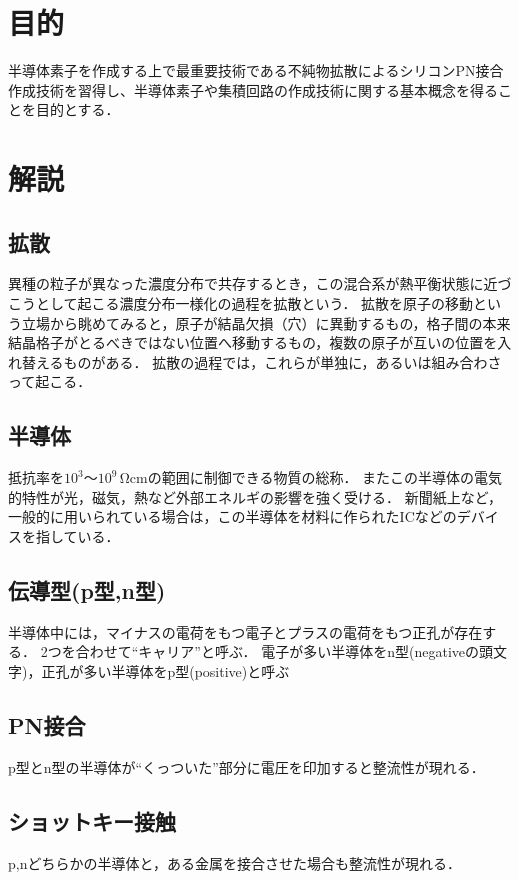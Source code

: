 \documentclass[11pt]{jarticle}
\title{}
\begin{document}
\maketitle

\section{目的}
半導体素子を作成する上で最重要技術である不純物拡散によるシリコンPN接合作成技術を習得し、半導体素子や集積回路の作成技術に関する基本概念を得ることを目的とする．
\section{解説}
	\subsection{拡散}
		異種の粒子が異なった濃度分布で共存するとき，この混合系が熱平衡状態に近づこうとして起こる濃度分布一様化の過程を拡散という．
		拡散を原子の移動という立場から眺めてみると，原子が結晶欠損（穴）に異動するもの，格子間の本来結晶格子がとるべきではない位置へ移動するもの，複数の原子が互いの位置を入れ替えるものがある．
		拡散の過程では，これらが単独に，あるいは組み合わさって起こる．
	\subsection{半導体}
		抵抗率を$10^3～10^9\,\mathrm{\Omega cm}$の範囲に制御できる物質の総称．
		またこの半導体の電気的特性が光，磁気，熱など外部エネルギの影響を強く受ける．
		新聞紙上など，一般的に用いられている場合は，この半導体を材料に作られたICなどのデバイスを指している．
	\subsection{伝導型(p型,n型)}
		半導体中には，マイナスの電荷をもつ電子とプラスの電荷をもつ正孔が存在する．
		2つを合わせて``キャリア''と呼ぶ．
		電子が多い半導体をn型(negativeの頭文字)，正孔が多い半導体をp型(positive)と呼ぶ
	\subsection{PN接合}
		p型とn型の半導体が``くっついた''部分に電圧を印加すると整流性が現れる．
	\subsection{ショットキー接触}
		p,nどちらかの半導体と，ある金属を接合させた場合も整流性が現れる．
\end{document}
